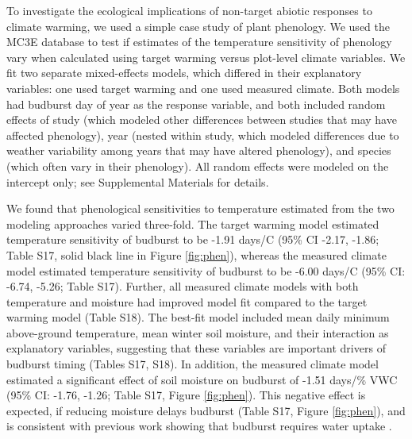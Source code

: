 \documentclass{article}
\begin{document}
\par To investigate the ecological implications of non-target abiotic responses to climate warming, we used a simple case study of plant phenology. We used the MC3E database to test if estimates of the temperature sensitivity of phenology vary when calculated using target warming versus plot-level climate variables. We fit two separate mixed-effects models, which differed in their explanatory variables: one used target warming and one used measured climate. Both models had budburst day of year as the response variable, and both included random effects of study (which modeled other differences between studies that may have affected phenology), year (nested within study, which modeled differences due to weather variability among years that may have altered phenology), and species (which often vary in their phenology).  All random effects were modeled on the intercept only; see Supplemental Materials for details.

\par We found that phenological sensitivities to temperature estimated from the two modeling approaches varied three-fold. The target warming model estimated temperature sensitivity of budburst to be -1.91 days/\degree C (95\% CI -2.17, -1.86; Table S17, solid black line in Figure \ref{fig:phen}), whereas the measured climate model estimated temperature sensitivity of budburst to be -6.00 days/\degree C (95\% CI: -6.74, -5.26; Table S17). Further, all measured climate models with both temperature and moisture had improved model fit compared to the target warming model (Table S18). The best-fit model included mean daily minimum above-ground temperature, mean winter soil moisture, and their interaction as explanatory variables, suggesting that these variables are important drivers of budburst timing (Tables S17, S18). 
In addition, the measured climate model estimated a significant effect of soil moisture on budburst of -1.51 days/\% VWC (95\% CI: -1.76, -1.26; Table S17, Figure \ref{fig:phen}). This negative effect is expected, if reducing moisture delays budburst (Table S17, Figure \ref{fig:phen}), and is consistent with previous work showing that budburst requires water uptake \citep{essiamah1986}. 
\end{document}
